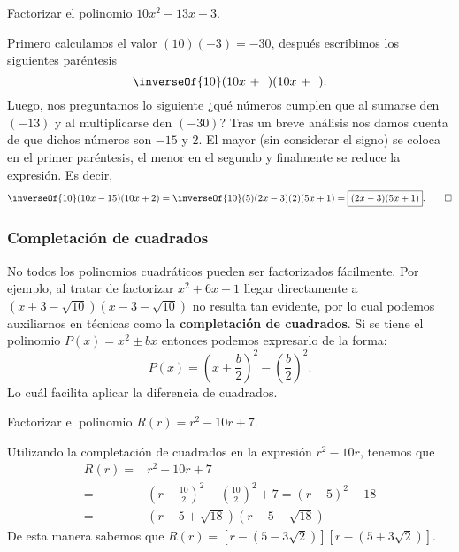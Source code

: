 \begin{example}
    Factorizar el polinomio $10x^2 - 13x - 3$.
\end{example}
\begin{solution}
    Primero calculamos el valor $(10)(-3) = -30$, después escribimos los siguientes paréntesis
    \[
        \inverseOf{10} (10x\ + \ \ )(10x\ + \ \ ).
    \]
    Luego, nos preguntamos lo siguiente ¿qué números cumplen que al sumarse den $(-13)$ y al multiplicarse den $(-30)$?
    Tras un breve análisis nos damos cuenta de que dichos números son $-15$ y 2.
    El mayor (sin considerar el signo) se coloca en el primer paréntesis, el menor en el segundo y finalmente se reduce la expresión.
    Es decir,
    \[
        \inverseOf{10} (10x - 15)(10x + 2) = \inverseOf{10} (5)(2x - 3)(2)(5x + 1) = \boxed{(2x - 3)(5x + 1)}. \qedhere
    \]
\end{solution}



\subsubsection{Completación de cuadrados}

No todos los polinomios cuadráticos pueden ser factorizados fácilmente.
Por ejemplo, al tratar de factorizar $x^2 + 6x - 1$ llegar directamente a $\left(x + 3 - \sqrt {10}\right)\left(x - 3-\sqrt {10}\right)$ no resulta tan evidente, por lo cual podemos auxiliarnos en técnicas como la \textbf{completación de cuadrados}.
Si se tiene el polinomio $P(x) = x^2 \pm bx$ entonces podemos expresarlo de la forma:
\[
    P(x) = \left( x \pm \frac{b}{2} \right)^2 - \left( \frac{b}{2} \right)^2.
\]
Lo cuál facilita aplicar la diferencia de cuadrados.

\begin{example}
    Factorizar el polinomio $R(r) = r^2 - 10r + 7$.
\end{example}
\begin{solution}
    Utilizando la completación de cuadrados en la expresión $r^2 - 10r$, tenemos que
    \begin{align*}
        R(r) =& r^2 - 10r + 7\\
        =& \left( r - \frac{10}{2} \right)^2 - \left( \frac{10}{2} \right)^2 + 7
        = \left( r - 5 \right)^2 - 18\\
        =& \left( r - 5 + \sqrt {18} \right)\left( r - 5 - \sqrt {18} \right)
    \end{align*}
    De esta manera sabemos que $R(r) = \left[ r - \left( 5 - 3\sqrt {2} \right)\right]\left[ r - \left( 5 + 3\sqrt {2} \right)\right]$.
\end{solution}


